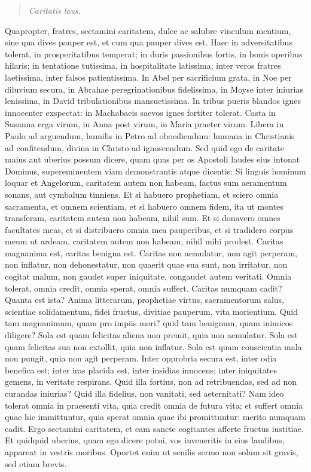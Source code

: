 \begin{quote}
\textit{Caritatis laus.}
\end{quote}


Quapropter, fratres, sectamini caritatem, dulce ac salubre vinculum mentium, sine qua dives pauper est, et cum qua pauper dives est. Haec in adversitatibus tolerat, in prosperitatibus temperat; in duris passionibus fortis, in bonis operibus hilaris; in tentatione tutissima, in hospitalitate latissima; inter veros fratres laetissima, inter falsos patientissima. In Abel per sacrificium grata, in Noe per diluvium secura, in Abrahae peregrinationibus fidelissima, in Moyse inter iniurias lenissima, in David tribulationibus mansuetissima. In tribus pueris blandos ignes innocenter exspectat: in Machabaeis saevos ignes fortiter tolerat. Casta in Susanna erga virum, in Anna post virum, in Maria praeter virum. Libera in Paulo ad arguendum, humilis in Petro ad oboediendum: humana in Christianis ad confitendum, divina in Christo ad ignoscendum. Sed quid ego de caritate maius aut uberius possum dicere, quam quas per os Apostoli laudes eius intonat Dominus, supereminentem viam demonstrantis atque dicentis: Si linguis hominum loquar et Angelorum, caritatem autem non habeam, factus sum aeramentum sonans, aut cymbalum tinniens. Et si habuero prophetiam, et sciero omnia sacramenta, et omnem scientiam, et si habuero omnem fidem, ita ut montes transferam, caritatem autem non habeam, nihil sum. Et si donavero omnes facultates meas, et si distribuero omnia mea pauperibus, et si tradidero corpus meum ut ardeam, caritatem autem non habeam, nihil mihi prodest. Caritas magnanima est, caritas benigna est. Caritas non aemulatur, non agit perperam, non inflatur, non dehonestatur, non quaerit quae sua sunt, non irritatur, non cogitat malum, non gaudet super iniquitate, congaudet autem veritati. Omnia tolerat, omnia credit, omnia sperat, omnia suffert. Caritas numquam cadit? Quanta est ista? Anima litterarum, prophetiae virtus, sacramentorum salus, scientiae solidamentum, fidei fructus, divitiae pauperum, vita morientium. Quid tam magnanimum, quam pro impiis mori? quid tam benignum, quam inimicos diligere? Sola est quam felicitas aliena non premit, quia non aemulatur. Sola est quam felicitas sua non extollit, quia non inflatur. Sola est quam conscientia mala non pungit, quia non agit perperam. Inter opprobria secura est, inter odia benefica est; inter iras placida est, inter insidias innocens; inter iniquitates gemens, in veritate respirans. Quid illa fortius, non ad retribuendas, sed ad non curandas iniurias? Quid illa fidelius, non vanitati, sed aeternitati? Nam ideo tolerat omnia in praesenti vita, quia credit omnia de futura vita; et suffert omnia quae hic immittuntur, quia sperat omnia quae ibi promittuntur: merito numquam cadit. Ergo sectamini caritatem, et eam sancte cogitantes afferte fructus iustitiae. Et quidquid uberius, quam ego dicere potui, vos inveneritis in eius laudibus, appareat in vestris moribus. Oportet enim ut senilis sermo non solum sit gravis, sed etiam brevis.

